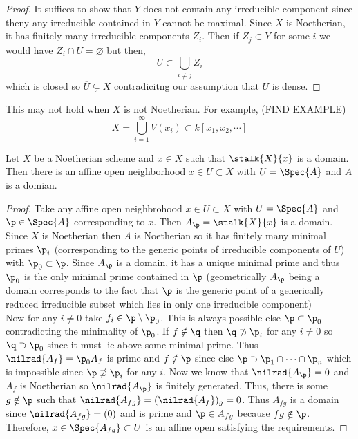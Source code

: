\documentclass[12pt]{article}
\begin{document}
\begin{proof}
It suffices to show that $Y$ does not contain any irreducible component since theny any irreducible contained in $Y$ cannot be maximal. Since $X$ is Noetherian, it has finitely many irreducible components $Z_i$. Then if $Z_j \subset Y$ for some $i$ we would have $Z_i \cap U = \varnothing$ but then,
\[ U \subset \bigcup_{i \neq j} Z_i \]
which is closed so $\overline{U} \subsetneq X$ contradicitng our assumption that $U$ is dense.
\end{proof}

\begin{example}
This may not hold when $X$ is not Noetherian. For example, (FIND EXAMPLE)
\[ X = \bigcup_{i = 1}^\infty V(x_i) \subset k[x_1, x_2, \cdots] \] 
\end{example}

\begin{lemma} \label{open_domain}
Let $X$ be a Noetherian scheme and $x \in X$ such that $\stalk{X}{x}$ is a domain. Then there is an affine open neighborhood $x \in U \subset X$ with $U = \Spec{A}$ and $A$ is a domian.
\end{lemma}

\begin{proof}
Take any affine open neighbrohood $x \in U \subset X$ with $U = \Spec{A}$ and $\p \in \Spec{A}$ corresponding to $x$. Then $A_\p = \stalk{X}{x}$ is a domain. Since $X$ is Noetherian then $A$ is Noetherian so it has finitely many minimal primes $\p_i$ (corresponding to the generic points of irreducible components of $U$) with $\p_0 \subset \p$. Since $A_\p$ is a domain, it has a unique minimal prime and thus $\p_0$ is the only minimal prime contained in $\p$ (geometrically $A_\p$ being a domain corresponds to the fact that $\p$ is the generic point of a generically reduced irreducible subset which lies in only one irreducible component)
\bigskip\\
Now for any $i \neq 0$ take $f_i \in \p \setminus \p_0$. This is always possible else $\p \subset \p_0$ contradicting the minimality of $\p_0$. If $f \notin \q$ then $\q \not\supset \p_i$ for any $i \neq 0$ so $\q \supset \p_0$ since it must lie above some minimal prime. Thus $\nilrad{A_f} = \p_0 A_f$ is prime and $f \notin \p$ since else $\p \supset \p_1 \cap \cdots \cap \p_n$ which is impossible since $\p \not\supset \p_i$ for any $i$. Now we know that $\nilrad{A_\p} = 0$ and $A_f$ is Noetherian so $\nilrad{A_\p}$ is finitely generated. Thus, there is some $g \notin \p$ such that $\nilrad{A_{fg}} = (\nilrad{A_f})_g = 0$. Thus $A_{fg}$ is a domain since $\nilrad{A_{fg}} = (0)$ and is prime and $\p \in A_{fg}$ because $fg \notin \p$. Therefore, $x \in \Spec{A_{fg}} \subset U$ is an affine open satisfying the requirements. 
\end{proof}
\end{document}
